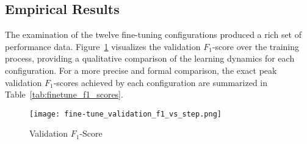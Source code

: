 \subsection{Empirical Results}\label{ch:4.4.2}
The examination of the twelve fine-tuning configurations produced a rich set of performance data. Figure~\ref{fig:binaryf1} visualizes the validation \(F_1\)-score over the training process, providing a qualitative comparison of the learning dynamics for each configuration. For a more precise and formal comparison, the exact peak validation \(F_1\)-scores achieved by each configuration are summarized in Table~\ref{tab:finetune_f1_scores}.
\begin{figure}[tb]
    \captionsetup{skip=5pt}
    \centering
    \texttt{[image: fine-tune\_validation\_f1\_vs\_step.png]}
    \caption{Validation \(F_1\)-Score}
    \label{fig:binaryf1}
\end{figure}
\begin{table}[tb]
    \captionsetup{skip=5pt}
    \centering
    \caption{Peak Validation F1-Score of Fine-Tuning Configurations on BGE Model}
    \label{tab:finetune_f1_scores}
\end{table}

